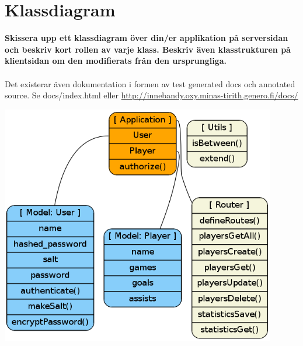 \documentclass[swedish,a4paper]{article}
\begin{document}
\section{Klassdiagram}

\textbf{Skissera upp ett klassdiagram över din/er applikation på serversidan och
beskriv kort rollen av varje klass. Beskriv även klasstrukturen på klientsidan
om den modifierats från den ursprungliga.}
\\
\\
Det existerar även dokumentation i formen av test generated docs och annotated
source. Se docs/index.html eller
\url{http://innebandy.oxy.minas-tirith.genero.fi/docs/}

\includegraphics[width=12cm]{../dot/class.png}
\end{document}
